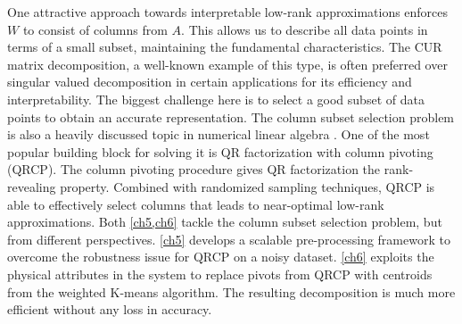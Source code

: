 One attractive approach towards interpretable low\hyp{}rank approximations
enforces $W$ to consist of columns from $A$. This allows us to describe all data
points in terms of a small subset, maintaining the fundamental characteristics.
The CUR matrix decomposition, a well\hyp{}known example of this type, is often
preferred over singular valued decomposition in certain applications for its
efficiency and interpretability. The biggest challenge here is to select a good
subset of data points to obtain an accurate representation. The column subset
selection problem is also a heavily discussed topic in numerical linear algebra
\cite{boutsidis2009improved,deshpande2010efficient}. One of the most popular
building block for solving it is QR factorization with column pivoting (QRCP).
The column pivoting procedure gives QR factorization the rank\hyp{}revealing
property. Combined with randomized sampling techniques, QRCP is able to
effectively select columns that leads to near\hyp{}optimal low\hyp{}rank
approximations. Both \cref{ch5,ch6} tackle the column subset selection problem,
but from different perspectives. \cref{ch5} develops a scalable 
pre\hyp{}processing framework to overcome the robustness issue for QRCP on a
noisy dataset. \cref{ch6} exploits the physical attributes in the system to
replace pivots from QRCP with centroids from the weighted K\hyp{}means
algorithm. The resulting decomposition is much more efficient without any loss
in accuracy.